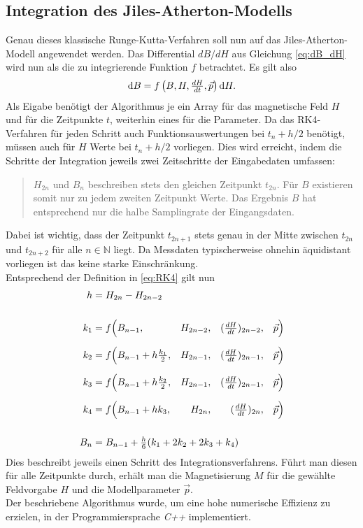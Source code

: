 \documentclass{scrartcl}
\begin{document}
\subsection{Integration des Jiles-Atherton-Modells}
Genau dieses klassische Runge-Kutta-Verfahren soll nun auf das Jiles-Atherton-Modell angewendet werden. Das Differential $dB/dH$ aus Gleichung \ref{eq:dB_dH} wird nun als die zu integrierende Funktion $f$ betrachtet. Es gilt also
\begin{equation}
	\mathop{}\!\mathrm{d} B = f\left(B, H, \tfrac{dH}{dt}, \vec{p}\right)\mathop{}\!\mathrm{d} H.
\end{equation}
Als Eigabe benötigt der Algorithmus je ein Array für das magnetische Feld $H$ und für die Zeitpunkte $t$, weiterhin eines für die Parameter. Da das RK4-Verfahren für jeden Schritt auch Funktionsauswertungen bei $t_n + h/2$ benötigt, müssen auch für $H$ Werte bei $t_n + h/2$ vorliegen. Dies wird erreicht, indem die Schritte der Integration jeweils zwei Zeitschritte der Eingabedaten umfassen:
\begin{quote}
	$H_{2n}$ und $B_n$ beschreiben stets den gleichen Zeitpunkt $t_{2n}$. Für $B$ existieren somit nur zu jedem zweiten Zeitpunkt Werte. Das Ergebnis $B$ hat entsprechend nur die halbe Samplingrate der Eingangsdaten.
\end{quote}
Dabei ist wichtig, dass der Zeitpunkt $t_{2n+1}$ stets genau in der Mitte zwischen $t_{2n}$ und $t_{2n+2}$ für alle $n \in \mathbb{N}$ liegt. Da Messdaten typischerweise ohnehin äquidistant vorliegen ist das keine starke Einschränkung.\\
Entsprechend der Definition in \ref{eq:RK4} gilt nun
\begin{equation}
\begin{aligned}
	h &= H_{2n} - H_{2n - 2} \span\span\span\span\span\\[0.5cm]
	k_1 &= f\Big(B_{n-1}, &{} H_{2n-2}, &&{} (\tfrac{dH}{dt})_{2n-2},&&{}\vec{p}\Big)\\[0.2cm]
	k_2 &= f\Big(B_{n-1} + h\tfrac{k_1}{2},&{} H_{2n-1},&&{} (\tfrac{dH}{dt})_{2n-1},&&{}\vec{p}\Big)\\[0.2cm]
	k_3 &= f\Big(B_{n-1} + h\tfrac{k_2}{2},&{} H_{2n-1},&&{} (\tfrac{dH}{dt})_{2n-1},&&{} \vec{p}\Big)\\[0.2cm]
	k_4 &= f\Big(B_{n-1} + h k_3, &{} H_{2n}, &&{} (\tfrac{dH}{dt})_{2n},&&{}\vec{p}\Big)\\[0.5cm]
	B_n &= B_{n-1} + \tfrac{h}{6}(k_1 + 2k_2 + 2k_3 + k_4)  \span\span\span\span\span
\end{aligned}
\end{equation}
Dies beschreibt jeweils einen Schritt des Integrationsverfahrens. Führt man diesen für alle Zeitpunkte durch, erhält man die Magnetisierung $M$ für die gewählte Feldvorgabe $H$ und die Modellparameter $\vec{p}$.\\
Der beschriebene Algorithmus wurde, um eine hohe numerische Effizienz zu erzielen, in der Programmiersprache \emph{C++} implementiert.
\end{document}
